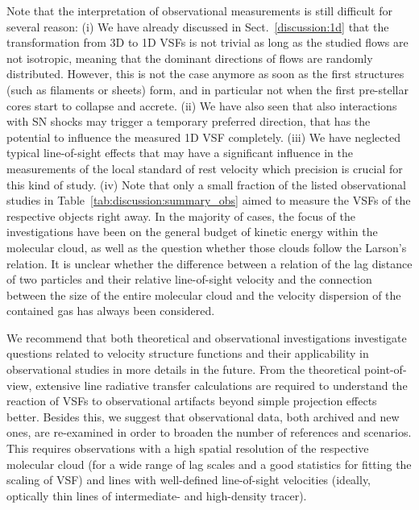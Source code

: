 Note that the interpretation of observational measurements is still difficult for several reason:
(i) We have already discussed in Sect.~\ref{discussion:1d} that the transformation from 3D to 1D VSFs is not trivial as long as the studied flows are not isotropic, meaning that the dominant directions of flows are randomly distributed. 
However, this is not the case anymore as soon as the first structures (such as filaments or sheets) form, and in particular not when the first pre-stellar cores start to collapse and accrete.
(ii) We have also seen that also interactions with SN shocks may trigger a temporary preferred direction, that has the potential to influence the measured 1D VSF completely.
(iii) We have neglected typical line-of-sight effects that may have a significant influence in the measurements of the local standard of rest velocity which precision is crucial for this kind of study.
(iv) Note that only a small fraction of the listed observational studies in Table~\ref{tab:discussion:summary_obs} aimed to measure the VSFs of the respective objects right away.
In the majority of cases, the focus of the investigations have been on the general budget of kinetic energy within the molecular cloud, as well as the question whether those clouds follow the Larson's relation.
It is unclear whether the difference between a relation of the lag distance of two particles and their relative line-of-sight velocity and the connection between the size of the entire molecular cloud and the velocity dispersion of the contained gas has always been considered.

We recommend that  both theoretical and observational investigations investigate questions related to velocity structure functions and their applicability in observational studies in more details in the future.
From the theoretical point-of-view, extensive line radiative transfer calculations are required to understand the reaction of VSFs to observational artifacts beyond simple projection effects better.
Besides this, we suggest that observational data, both archived and new ones, are re-examined in order to broaden the number of references and scenarios. 
This requires observations with a high spatial resolution of the respective molecular cloud (for a wide range of lag scales and a good statistics for fitting the scaling of VSF) and lines with well-defined line-of-sight velocities (ideally, optically thin lines of intermediate- and high-density tracer). 










